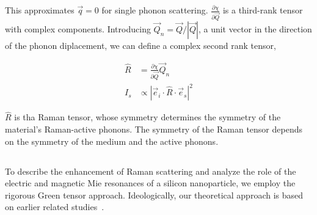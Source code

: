        This approximates $\vec{q} = 0$ for single phonon scattering. $\frac{\partial\chi}{\partial\vec{Q}}$ is a third-rank tensor with
        complex components. Introducing $\vec{Q}_n = \vec{Q}/|\vec{Q}|$, a unit vector in the direction of the phonon diplacement, we can
        define a complex second rank tensor,

        \begin{align}
            \hat{R} &= \frac{\partial\chi}{\partial\vec{Q}}\vec{Q}_n \\
            I_s &\propto | \vec{e}_i \cdot \hat{R} \cdot\vec{e}_s|^2
        \end{align}

        $\hat{R}$ is tha Raman tensor, whose symmetry determines the symmetry of the material's Raman-active phonons. The symmetry of the
        Raman tensor depends on the symmetry of the medium and the active phonons.

    \subsection{}
        \label{sec:Theory}
            To describe the enhancement of Raman scattering and analyze the role of the electric and magnetic
        Mie resonances of a silicon nanoparticle, we employ the rigorous Green tensor approach. Ideologically,
        our theoretical approach is based on earlier related studies~\cite{canccado2014theory, murphy1983enhanced}.

